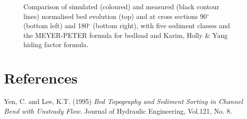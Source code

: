 \begin{figure} [!h]
\centering
{}
\caption{Comparison of simulated (coloured) and measured (black contour lines) normalised bed evolution (top) and  at cross sections 90$^{\circ}$ (bottom left) and 180$^{\circ}$ (bottom right),
with five sediment classes and the MEYER-PETER formula for bedload and Karim, Holly \& Yang hiding factor formula.}\label{fig:results_multi1_hid4}
\end{figure}


\section{References}
%
Yen, C. and Lee, K.T. (1995) \textit{ Bed Topography and Sediment Sorting in Channel Bend
with Unsteady Flow}. Journal of Hydraulic Engineering, Vol.121, No. 8.
